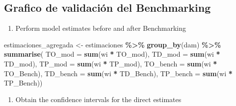 \documentclass[
  12pt,
]{book}
\newenvironment{Shaded}{\begin{snugshade}}{\end{snugshade}}
\newcommand{\AttributeTok}[1]{\textcolor[rgb]{0.13,0.29,0.53}{#1}}
\newcommand{\FunctionTok}[1]{\textcolor[rgb]{0.13,0.29,0.53}{\textbf{#1}}}
\newcommand{\NormalTok}[1]{#1}
\newcommand{\OtherTok}[1]{\textcolor[rgb]{0.56,0.35,0.01}{#1}}
\newcommand{\SpecialCharTok}[1]{\textcolor[rgb]{0.81,0.36,0.00}{\textbf{#1}}}
\providecommand{\tightlist}{%
  \setlength{\itemsep}{0pt}\setlength{\parskip}{0pt}}
\begin{document}
\hypertarget{grafico-de-validaciuxf3n-del-benchmarking}{%
\subsection{Grafico de validación del Benchmarking}\label{grafico-de-validaciuxf3n-del-benchmarking}}

\begin{enumerate}
\def\labelenumi{\arabic{enumi}.}
\tightlist
\item
  Perform model estimates before and after Benchmarking
\end{enumerate}

\begin{Shaded}
\begin{Highlighting}[]
\NormalTok{estimaciones\_agregada }\OtherTok{\textless{}{-}}\NormalTok{ estimaciones }\SpecialCharTok{\%\textgreater{}\%}
  \FunctionTok{group\_by}\NormalTok{(dam) }\SpecialCharTok{\%\textgreater{}\%} 
  \FunctionTok{summarise}\NormalTok{(}
    \AttributeTok{TO\_mod =} \FunctionTok{sum}\NormalTok{(wi }\SpecialCharTok{*}\NormalTok{ TO\_mod),}
    \AttributeTok{TD\_mod =} \FunctionTok{sum}\NormalTok{(wi }\SpecialCharTok{*}\NormalTok{ TD\_mod),}
    \AttributeTok{TP\_mod =} \FunctionTok{sum}\NormalTok{(wi }\SpecialCharTok{*}\NormalTok{ TP\_mod),}
    \AttributeTok{TO\_bench =} \FunctionTok{sum}\NormalTok{(wi }\SpecialCharTok{*}\NormalTok{ TO\_Bench),}
    \AttributeTok{TD\_bench =} \FunctionTok{sum}\NormalTok{(wi }\SpecialCharTok{*}\NormalTok{ TD\_Bench),}
    \AttributeTok{TP\_bench =} \FunctionTok{sum}\NormalTok{(wi }\SpecialCharTok{*}\NormalTok{ TP\_Bench))}
\end{Highlighting}
\end{Shaded}

\begin{enumerate}
\def\labelenumi{\arabic{enumi}.}
\setcounter{enumi}{1}
\tightlist
\item
  Obtain the confidence intervals for the direct estimates
\end{enumerate}
\end{document}
